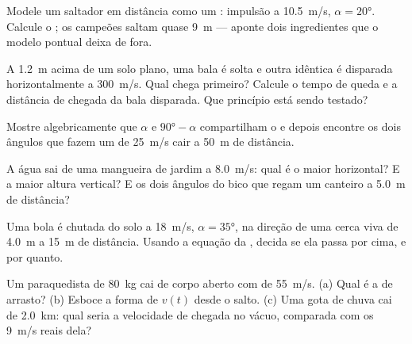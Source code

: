 \begin{exercise}[$\star\star$]\label{exo:g12:projectile-motion:9}
Modele um saltador em distância como um : impulsão a \qty{10.5}{m/s},
$\alpha = \ang{20}$. Calcule o ; os campeões saltam quase \qty{9}{m} ---
aponte dois ingredientes que o modelo pontual deixa de fora.
\end{exercise}

\begin{exercise}[$\star\star$]\label{exo:g12:projectile-motion:10}
A \qty{1.2}{m} acima de um solo plano, uma bala é solta e outra idêntica é disparada
horizontalmente a \qty{300}{m/s}. Qual chega primeiro? Calcule o tempo de queda e a
distância de chegada da bala disparada. Que princípio está sendo testado?
\end{exercise}

\begin{exercise}[$\star\star$]\label{exo:g12:projectile-motion:11}
Mostre algebricamente que $\alpha$ e $\ang{90} - \alpha$ compartilham o  e
depois encontre os dois ângulos que fazem um  de \qty{25}{m/s} cair a
\qty{50}{m} de distância.
\end{exercise}

\begin{exercise}[$\star\star\star$]\label{exo:g12:projectile-motion:12}
A água sai de uma mangueira de jardim a \qty{8.0}{m/s}: qual é o maior 
horizontal? E a maior altura vertical? E os dois ângulos do bico que regam um canteiro
a \qty{5.0}{m} de distância?
\end{exercise}

\begin{exercise}[$\star\star\star$]\label{exo:g12:projectile-motion:13}
Uma bola é chutada do solo a \qty{18}{m/s}, $\alpha = \ang{35}$, na direção de uma
cerca viva de \qty{4.0}{m} a \qty{15}{m} de distância. Usando a equação da ,
decida se ela passa por cima, e por quanto.
\end{exercise}

\begin{exercise}[$\star\star\star$]\label{exo:g12:projectile-motion:14}
Um paraquedista de \qty{80}{kg} cai de corpo aberto com  de
\qty{55}{m/s}. (a) Qual é a  de arrasto? (b) Esboce a forma de $v(t)$ desde o
salto. (c) Uma gota de chuva cai de \qty{2.0}{km}: qual seria a velocidade de chegada
no vácuo, comparada com os \qty{9}{m/s} reais dela?
\end{exercise}

